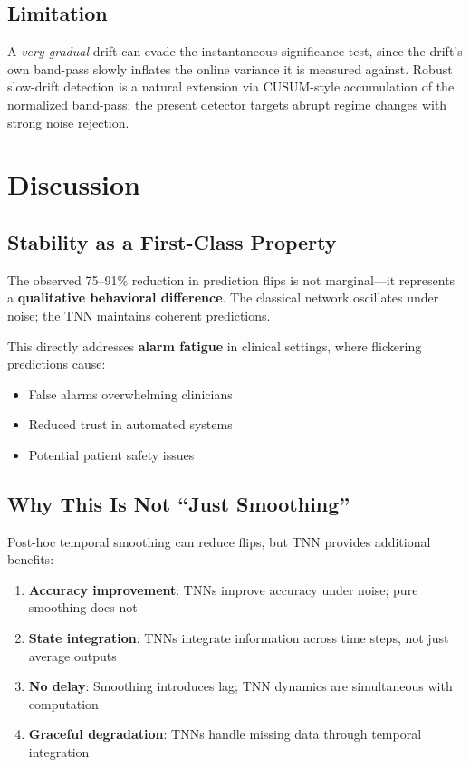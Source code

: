 \documentclass[11pt]{article}
\begin{document}
\subsection{Limitation}

A \emph{very gradual} drift can evade the instantaneous significance test, since
the drift's own band-pass slowly inflates the online variance it is measured
against. Robust slow-drift detection is a natural extension via CUSUM-style
accumulation of the normalized band-pass; the present detector targets abrupt
regime changes with strong noise rejection.

\section{Discussion}

\subsection{Stability as a First-Class Property}

The observed 75--91\% reduction in prediction flips is not marginal---it represents a \textbf{qualitative behavioral difference}. The classical network oscillates under noise; the TNN maintains coherent predictions.

This directly addresses \textbf{alarm fatigue} in clinical settings, where flickering predictions cause:
\begin{itemize}
    \item False alarms overwhelming clinicians
    \item Reduced trust in automated systems
    \item Potential patient safety issues
\end{itemize}

\subsection{Why This Is Not ``Just Smoothing''}

Post-hoc temporal smoothing can reduce flips, but TNN provides additional benefits:

\begin{enumerate}
    \item \textbf{Accuracy improvement}: TNNs improve accuracy under noise; pure smoothing does not
    \item \textbf{State integration}: TNNs integrate information across time steps, not just average outputs
    \item \textbf{No delay}: Smoothing introduces lag; TNN dynamics are simultaneous with computation
    \item \textbf{Graceful degradation}: TNNs handle missing data through temporal integration
\end{enumerate}
\end{document}
